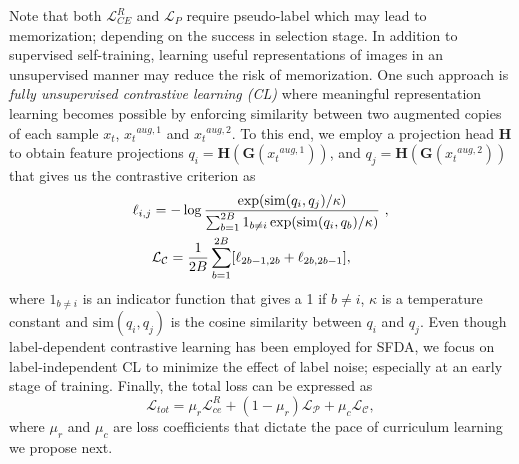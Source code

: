 \documentclass[10pt,twocolumn,letterpaper]{article}
\begin{document}
Note that both $\mathcal{L}_{CE}^{R}$ and 
$\mathcal{L}_{P}$ require pseudo-label which may lead to memorization; depending on the success in selection stage. In addition to supervised self-training, learning useful representations of images in an unsupervised manner may reduce the risk of memorization. One such approach is \emph{fully unsupervised contrastive learning (CL)} where meaningful representation learning becomes possible by enforcing similarity between two augmented copies of each sample $x_t$, ${x_t}^{aug,1}$ and ${x_t}^{aug,2}$. To this end, we employ a projection head $\mathbf{H}$ to obtain feature projections $q_{i} = \mathbf{H}(\mathbf{G}({x_t}^{aug,1}))$, and $q_{j} = \mathbf{H}(\mathbf{G}({x_t}^{aug,2}))$ that gives us the contrastive criterion \cite{chen2020simple,khosla2020supervised} as
\begin{align}
        \vspace{-1mm}
        \ell_{i,j}  & = -\log \frac{\exp(\mathrm{sim}(q_{i}, q_{j})/\kappa)}{\sum_{b=1}^{2B} 1_{b \neq i}\exp(\mathrm{sim}(q_i, q_b)/\kappa)}~, \\
        & \mathcal{L}_\mathcal{C}= \frac{1}{2B}\sum_{b=1}^{2B}[\ell_{2b-1,2b} + \ell_{2b,2b-1}] \label{eq:contratstive_loss},
        \vspace{-1mm}
\end{align}
where $1_{b \neq i}$ is an indicator function that gives a 1 if $b \neq i$, $\kappa$ is a temperature constant and $\mathrm{sim}(q_{i}, q_{j})$ is the cosine similarity between $q_{i}$ and $q_{j}$. Even though label-dependent contrastive learning has been employed for SFDA\cite{chen2022contrastive}, we focus on label-independent CL to minimize the effect of label noise; especially at an early stage of training. Finally, the total loss can be expressed as 
\begin{equation}
    \mathcal{L}_{tot} =  \mu_r \mathcal{L}_{ce}^R + (1-\mu_r) \mathcal{L}_\mathcal{P} + \mu_c \mathcal{L}_\mathcal{C}, \label{eq:total_loss} 
\end{equation}
where $\mu_r$ and $\mu_c$ are loss coefficients that dictate the pace of curriculum learning we propose next. 

\vspace{-2mm}
\end{document}
